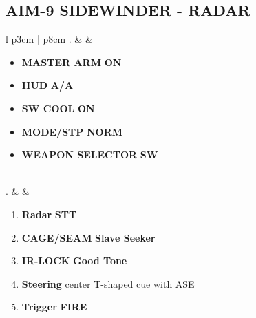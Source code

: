 \documentclass[8pt,usenames,dvipsnames,twoside]{article}
\begin{document}
	\subsection{AIM-9 SIDEWINDER - RADAR}
	\begin{center}
		\begin{tabular}{l p{3cm} | p{8cm}}
			. &  &
			\begin{minipage}[t]{\linewidth}
				\vspace{-7pt}
				\begin{itemize}
					\item \textbf{MASTER ARM} \dotfill \textbf{ON}
					\item \textbf{HUD} \dotfill \textbf{A/A}
					\item \textbf{SW COOL} \dotfill \textbf{ON}
					\item \textbf{MODE/STP} \dotfill \textbf{NORM}
					\item \textbf{WEAPON SELECTOR} \dotfill \textbf{SW}
				\end{itemize}
			\end{minipage} \\
			. &  &
			\begin{minipage}[t]{\linewidth}
				\vspace{-7pt}
				\begin{enumerate}
					\item \textbf{Radar} \dotfill \textbf{STT}
					\item \textbf{CAGE/SEAM} \dotfill \textbf{Slave Seeker}
					\item \textbf{IR-LOCK} \dotfill \textbf{Good Tone}
					\item \textbf{Steering} \dotfill center T-shaped cue with ASE
					\item \textbf{Trigger} \dotfill \textbf{FIRE}
				\end{enumerate}
			\end{minipage} \\
			\bottomrule
		\end{tabular}
	\end{center}

	\clearpage
\end{document}
